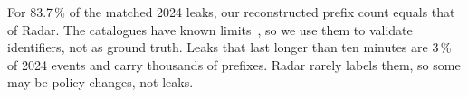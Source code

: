 
For 83.7\,\% of the matched 2024 leaks, our reconstructed prefix count equals that of Radar.
The catalogues have known limits~\cite{grip,cloudflare2023hijack,liu2026}, so we use them to validate identifiers, not as ground truth.
Leaks that last longer than ten minutes are 3\,\% of 2024 events and carry thousands of prefixes.
Radar rarely labels them, so some may be policy changes, not leaks.

